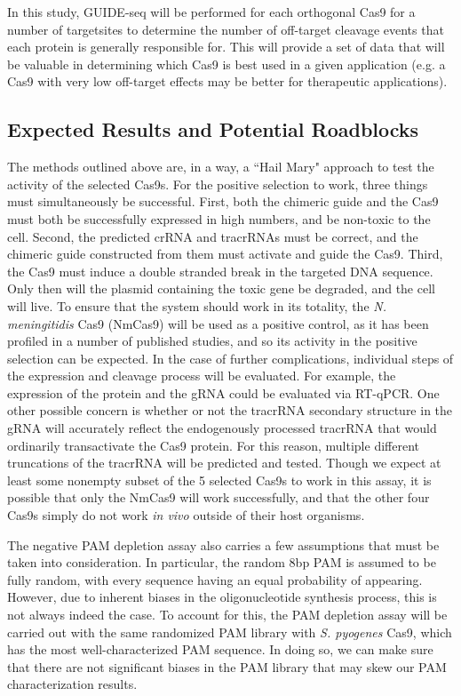 In this study, GUIDE-seq will be performed for each orthogonal Cas9 for a number of targetsites to determine the number of off-target cleavage events that each protein is generally responsible for. This will provide a set of data that will be valuable in determining which Cas9 is best used in a given application (e.g. a Cas9 with very low off-target effects may be better for therapeutic applications).

\subsection{Expected Results and Potential Roadblocks}

The methods outlined above are, in a way, a ``Hail Mary" approach to test the activity of the selected Cas9s. For the positive selection to work, three things must simultaneously be successful. First, both the chimeric guide and the Cas9 must both be successfully expressed in high numbers, and be non-toxic to the cell. Second, the predicted crRNA and tracrRNAs must be correct, and the chimeric guide constructed from them must activate and guide the Cas9. Third, the Cas9 must induce a double stranded break in the targeted DNA sequence. Only then will the plasmid containing the toxic gene be degraded, and the cell will live. To ensure that the system should work in its totality, the \textit{N. meningitidis} Cas9 (NmCas9) will be used as a positive control, as it has been profiled in a number of published studies, and so its activity in the positive selection can be expected. In the case of further complications, individual steps of the expression and cleavage process will be evaluated. For example, the expression of the protein and the gRNA could be evaluated via RT-qPCR. One other possible concern is whether or not the tracrRNA secondary structure in the gRNA will accurately reflect the endogenously processed tracrRNA that would ordinarily transactivate the Cas9 protein. For this reason, multiple different truncations of the tracrRNA will be predicted and tested. Though we expect at least some nonempty subset of the 5 selected Cas9s to work in this assay, it is possible that only the NmCas9 will work successfully, and that the other four Cas9s simply do not work \textit{in vivo} outside of their host organisms.

The negative PAM depletion assay also carries a few assumptions that must be taken into consideration. In particular, the random 8bp PAM is assumed to be fully random, with every sequence having an equal probability of appearing. However, due to inherent biases in the oligonucleotide synthesis process, this is not always indeed the case. To account for this, the PAM depletion assay will be carried out with the same randomized PAM library with \textit{S. pyogenes} Cas9, which has the most well-characterized PAM sequence. In doing so, we can make sure that there are not significant biases in the PAM library that may skew our PAM characterization results.

